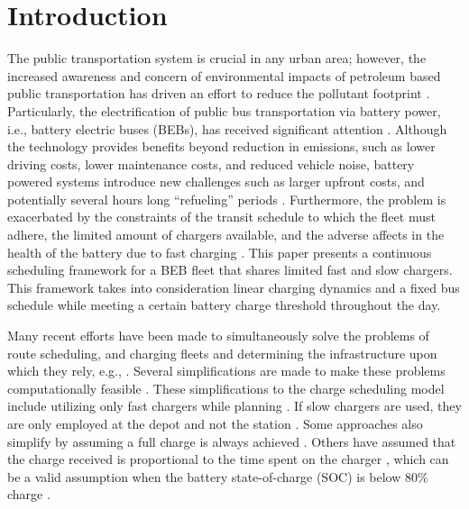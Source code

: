 \section{Introduction}
\label{sec:introduction}

The public transportation system is crucial in any urban area; however, the increased awareness and concern of
environmental impacts of petroleum based public transportation has driven an effort to reduce the pollutant footprint
\cite{DeFilippo2014, Xylia2018, Guida2017, Li2016}. Particularly, the electrification of public bus transportation via
battery power, i.e., battery electric buses (BEBs), has received significant attention \cite{Li2016}. Although the
technology provides benefits beyond reduction in emissions, such as lower driving costs, lower maintenance costs, and
reduced vehicle noise, battery powered systems introduce new challenges such as larger upfront costs, and potentially
several hours long ``refueling'' periods \cite{Xylia2018, Li2016}. Furthermore, the problem is exacerbated by the
constraints of the transit schedule to which the fleet must adhere, the limited amount of chargers available, and the
adverse affects in the health of the battery due to fast charging \cite{Lutsey2019}. This paper presents a continuous
scheduling framework for a BEB fleet that shares limited fast and slow chargers. This framework takes into consideration
linear charging dynamics and a fixed bus schedule while meeting a certain battery charge threshold throughout the day.

Many recent efforts have been made to simultaneously solve the problems of route scheduling, and charging fleets and
determining the infrastructure upon which they rely, e.g., \cite{Wei2018, Sebastiani2016, Hoke2014, Wang2017}. Several
simplifications are made to make these problems computationally feasible . These simplifications to the
charge scheduling model include utilizing only fast chargers while planning \cite{Wei2018, Sebastiani2016, Wang2017,
  Zhou2020-0, Liu2020, Yang2018, Wang2017a, Qin2016}. If slow chargers are used, they are only employed at the depot and
not the station \cite{He2020, Tang2019}. Some approaches also simplify by assuming a full charge is always achieved
\cite{Wei2018, Wang2017, Zhou2020-0, Wang2017a}. Others have assumed that the charge received is proportional to the
time spent on the charger \cite{Liu2020, Yang2018}, which can be a valid assumption when the battery state-of-charge
(SOC) is below 80\% charge \cite{Liu2020}.


